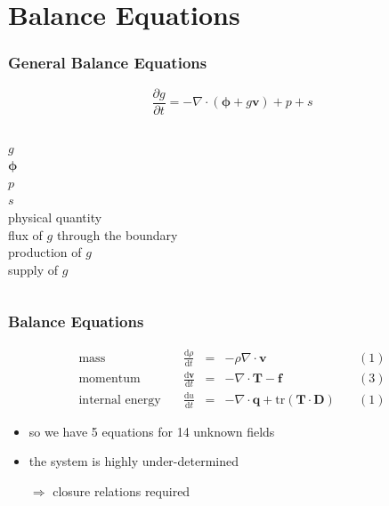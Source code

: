 \documentclass[hide notes,intlimits]{beamer}
\begin{document}
\section{Balance Equations}

\begin{frame}
  \frametitle{General Balance Equations}
  \begin{equation*}
   \frac{\partial g}{\partial t} = - \nabla \cdot \left(\boldsymbol{\phi} + g\mathbf{v}\right) + p + s
 \end{equation*}
 \begin{columns}
   \column[C]{0.1cm}
   $g$ \\
   $\boldsymbol{\phi}$ \\
   $p$ \\
   $s$ \\
   \column[C]{6cm}
   physical quantity \\
   flux of $g$ through the boundary \\
   production of $g$ \\
   supply of $g$
 \end{columns}
\end{frame}


\begin{frame}
  \frametitle{Balance Equations}
  \large{
  \begin{equation*}
  \begin{array}{lcclc}
    \text{mass} \quad &  \frac{\text{d} \rho}{\text{d} t} & = & -\rho\nabla \cdot \mathbf{v} \quad & (1)\\[.25em]
    \text{momentum} \quad & \frac{\text{d} \mathbf{v}}{\text{d} t} & = & -\nabla \cdot \mathbf{T} - \mathbf{f} \quad & (3) \\[.25em]
    \text{internal energy} \quad & \frac{\text{d} u}{\text{d} t} & = & - \nabla \cdot \mathbf{q} + \text{tr} \left(\mathbf{T}\cdot\mathbf{D}\right) \quad & (1)
  \end{array}
  \end{equation*}
  }
  \begin{itemize}
   \item so we have 5 equations for 14 unknown fields
   \item the system is highly under-determined
   \item[$\Rightarrow$] \alert{closure relations} required
 \end{itemize}
\end{frame}
\end{document}
